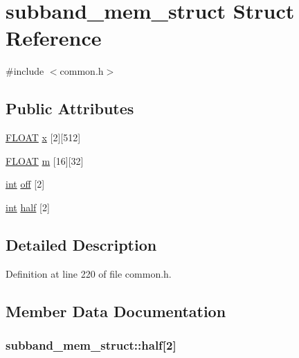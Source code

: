 \hypertarget{structsubband__mem__struct}{}\section{subband\+\_\+mem\+\_\+struct Struct Reference}
\label{structsubband__mem__struct}


{\ttfamily \#include $<$common.\+h$>$}

\subsection*{Public Attributes}
\begin{DoxyCompactItemize}
\item 
\hyperlink{twolame_2libtwolame_2common_8h_ae8690abbffa85934d64d545920e2b108}{F\+L\+O\+AT} \hyperlink{structsubband__mem__struct_ac17a1e96743f74198a3163771a8e8994}{x} \mbox{[}2\mbox{]}\mbox{[}512\mbox{]}
\item 
\hyperlink{twolame_2libtwolame_2common_8h_ae8690abbffa85934d64d545920e2b108}{F\+L\+O\+AT} \hyperlink{structsubband__mem__struct_a7fcc6bbca3e1e6f301c5b790e2ad60bb}{m} \mbox{[}16\mbox{]}\mbox{[}32\mbox{]}
\item 
\hyperlink{xmltok_8h_a5a0d4a5641ce434f1d23533f2b2e6653}{int} \hyperlink{structsubband__mem__struct_af474759ad43b96ba7af66a985de4e7c9}{off} \mbox{[}2\mbox{]}
\item 
\hyperlink{xmltok_8h_a5a0d4a5641ce434f1d23533f2b2e6653}{int} \hyperlink{structsubband__mem__struct_a10972335a4744f4175a5e549ce02de61}{half} \mbox{[}2\mbox{]}
\end{DoxyCompactItemize}


\subsection{Detailed Description}


Definition at line 220 of file common.\+h.



\subsection{Member Data Documentation}
\subsubsection[{\texorpdfstring{half}{half}}]{ subband\+\_\+mem\+\_\+struct\+::half\mbox{[}2\mbox{]}}\hypertarget{structsubband__mem__struct_a10972335a4744f4175a5e549ce02de61}{}\label{structsubband__mem__struct_a10972335a4744f4175a5e549ce02de61}


